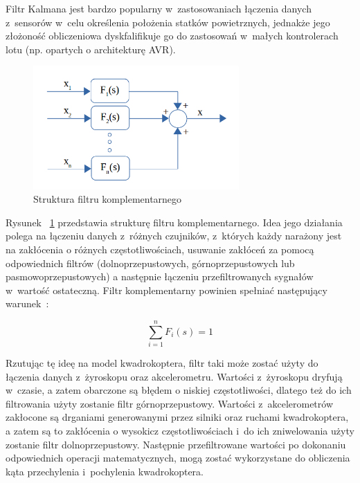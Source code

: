 Filtr Kalmana jest bardzo popularny w~zastosowaniach łączenia danych z~sensorów w~celu określenia położenia statków powietrznych, jednakże jego złożoność obliczeniowa dyskfalifikuje go do zastosowań w~małych kontrolerach lotu (np. opartych o architekturę AVR).

\begin{figure}[H]
	\centering
	\includegraphics[width=0.7\textwidth]{Pictures/complementary_filter_general.png}
		\caption[Struktura filtru komplementarnego]{Struktura filtru komplementarnego~\cite{filters2}}
	\label{fig:complementary_filter_general}
\end{figure}

Rysunek ~\ref{fig:complementary_filter_general} przedstawia strukturę filtru komplementarnego. Idea jego działania polega na łączeniu danych z~różnych czujników, z~których każdy narażony jest na zakłócenia o różnych częstotliwościach, usuwanie zakłóceń za pomocą odpowiednich filtrów (dolnoprzepustowych, górnoprzepustowych lub pasmowoprzepustowych) a następnie łączeniu przefiltrowanych sygnałów w~wartość ostateczną. Filtr komplementarny powinien spełniać następujący warunek~\cite{filters2}:

\begin{equation}
	\sum_{i=1}^{n}F_{i}(s) = 1
\end{equation}

Rzutując tę ideę na model kwadrokoptera, filtr taki może zostać użyty do łączenia danych z~żyroskopu oraz akcelerometru. Wartości z~żyroskopu dryfują w~czasie, a zatem obarczone są błędem o niskiej częstotliwości, dlatego też do ich filtrowania użyty zostanie filtr górnoprzepustowy. Wartości z~akcelerometrów zakłocone są drganiami generowanymi przez silniki oraz ruchami kwadrokoptera, a zatem są to zakłócenia o wysokicz częstotliwościach i~do ich zniwelowania użyty zostanie filtr dolnoprzepustowy. Następnie przefiltrowane wartości po dokonaniu odpowiednich operacji matematycznych, mogą zostać wykorzystane do obliczenia kąta przechylenia i~pochylenia kwadrokoptera.

